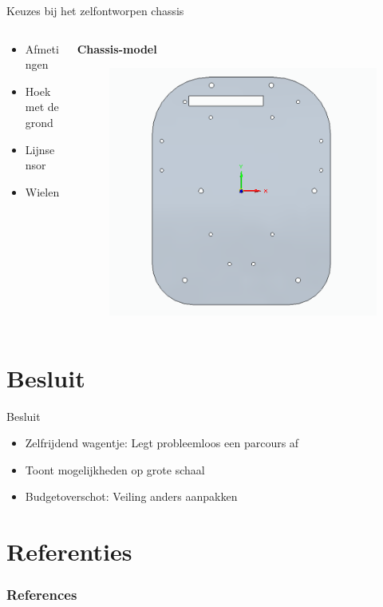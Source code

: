 \documentclass[aspectratio=169,kulak,t,handout]{kulakbeamer} %
\begin{document}
\begin{frame}{Keuzes bij het zelfontworpen chassis}
	\begin{columns}
	\begin{column}{0.50\textwidth}\centering
		\begin{itemize}
			\Large\item Afmetingen
			\item Hoek met de grond
			\item Lijnsensor
			\item Wielen
		\end{itemize}
	\end{column}
	\begin{column}{0.75\textwidth}\centering
		{\bf{Chassis-model}}\\[.2cm]
		\begin{figure}
			\centering
			\includegraphics[width=.55\textwidth]{chassis3d}
			
			\label{fig:chassis}
		\end{figure}
	\end{column}
\end{columns}	
\end{frame}

\section*{Besluit}






\begin{frame}{Besluit}
\begin{itemize}
	\large \item Zelfrijdend wagentje: Legt probleemloos een parcours af
	\item Toont mogelijkheden op grote schaal
	\item Budgetoverschot: Veiling anders aanpakken
	
\end{itemize}	
	
\end{frame}





	
\section{Referenties}

\begin{frame}[allowframebreaks]
	\frametitle{References}
	\nocite{*}
	
	
\end{frame}
\end{document}
